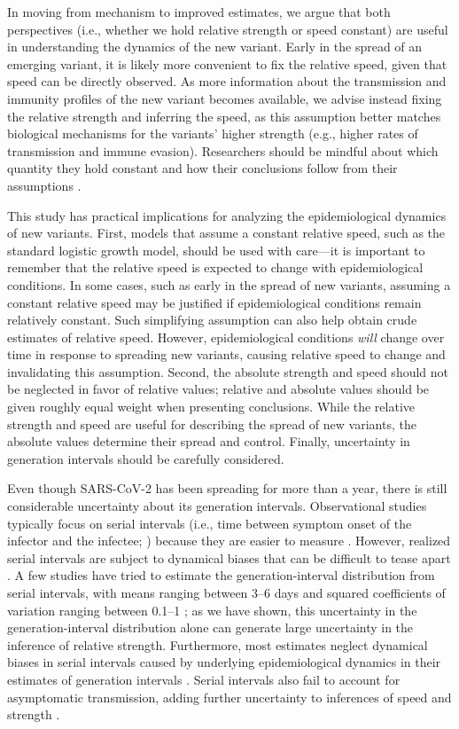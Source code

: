 \documentclass[12pt]{article}
\begin{document}
In moving from mechanism to improved estimates, we argue that both perspectives (i.e., whether we hold relative strength or speed constant) are useful in understanding the dynamics of the new variant.
Early in the spread of an emerging variant, it is likely more convenient to fix the relative speed, given that speed can be directly observed.
As more information about the transmission and immunity profiles of the new variant becomes available, we advise instead fixing the relative strength and inferring the speed, as this assumption better matches biological mechanisms for the variants' higher strength (e.g., higher rates of transmission and immune evasion).
Researchers should be mindful about which quantity they hold constant and how their conclusions follow from their assumptions \citep{doi:10.1098/rspb.2020.1556}.

This study has practical implications for analyzing the epidemiological dynamics of new variants.
First, models that assume a constant relative speed, such as the standard logistic growth model, should be used with care---it is important to remember that the relative speed is expected to change with epidemiological conditions.
In some cases, such as early in the spread of new variants, assuming a constant relative speed may be justified if epidemiological conditions remain relatively constant. 
Such simplifying assumption can also help obtain crude estimates of relative speed. 
However, epidemiological conditions \textit{will} change over time in response to spreading new variants, causing relative speed to change and invalidating this assumption.
Second, the absolute strength and speed should not be neglected in favor of relative values; relative and absolute values should be given roughly equal weight when presenting conclusions.
While the relative strength and speed are useful for describing the spread of new variants, the absolute values determine their spread and control.
Finally, uncertainty in generation intervals should be carefully considered.

Even though SARS-CoV-2 has been spreading for more than a year, there is still considerable uncertainty about its generation intervals.
Observational studies typically focus on serial intervals (i.e., time between symptom onset of the infector and the infectee; \cite{svensson2007note}) because they are easier to measure \citep{griffin2020rapid}.
However, realized serial intervals are subject to dynamical biases that can be difficult to tease apart \citep{park2021forward}.
A few studies have tried to estimate the generation-interval distribution from serial intervals, with means ranging between 3--6 days and squared coefficients of variation ranging between 0.1--1 \citep{ferretti2020quantifying,Ferretti2020timing,ganyani2020estimating,knight2020estimating}; 
as we have shown, this uncertainty in the generation-interval distribution alone can generate large uncertainty in the inference of relative strength.
Furthermore, most estimates neglect dynamical biases in serial intervals caused by underlying epidemiological dynamics in their estimates of generation intervals \citep{park2021forward}.
Serial intervals also fail to account for asymptomatic transmission, adding further uncertainty to inferences of speed and strength \citep{park2020time}.
\end{document}
